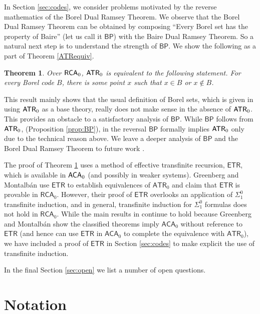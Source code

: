 \documentclass{amsart}
\newtheorem{thm}{Theorem}[section]
\theoremstyle{definition}
\theoremstyle{remark}
\newcommand{\system}[1]{\mbox{\fontfamily{cmss}\fontshape{n}\fontseries{m}%
    \selectfont#1}}
\newcommand{\RCA}{\system{RCA}\ensuremath{_0}}
\newcommand{\ACA}{\system{ACA}\ensuremath{_0}}
\newcommand{\ATR}{\system{ATR}\ensuremath{_0}}
\begin{document}
In Section \ref{sec:codes}, we consider problems motivated by
the reverse mathematics 
of the Borel Dual Ramsey Theorem.  We observe that 
the Borel Dual Ramsey Theorem can be obtained by composing 
``Every Borel set has the property of Baire'' (let us call it $\mathsf{BP}$)
with the Baire Dual Ramsey Theorem.  So a natural next step is to 
understand the strength of $\mathsf{BP}$.  We show the following
as a part of Theorem \ref{ATRequiv}.
\begin{thm}\label{thm:sillyATR}
Over $\RCA$, $\ATR$ is equivalent to the following statement.
For every Borel code $B$, there is some point $x$ 
such that $x \in B$ or $x \not \in B$. 
\end{thm}
This result mainly shows that the usual definition of Borel sets,
which is given in \cite{sosa} using $\ATR$ as a base theory,
really does not make sense in the absence of $\ATR$.  This 
provides an obstacle to a satisfactory analysis of $\mathsf{BP}$.
While $\mathsf{BP}$ follows from $\ATR$, (Proposition \ref{prop:BP}), 
in the reversal $\mathsf{BP}$ formally implies $\ATR$ only due to the 
technical reason above.  We leave a deeper analysis 
of $\mathsf{BP}$
and the Borel Dual Ramsey Theorem to future work \cite{ADMSW}.

The proof of Theorem \ref{thm:sillyATR} 
uses a method of effective transfinite recursion, $\mathsf{ETR}$, which is available in $\ACA$ (and possibly in weaker 
systems). Greenberg and Montalb\'{a}n \cite{GM} use 
$\mathsf{ETR}$ to establish equivalences of $\mathsf{ATR}_0$ and claim that $\mathsf{ETR}$ is provable in $\mathsf{RCA}_0$. However, their proof of $\mathsf{ETR}$ 
overlooks an application of $\Sigma^0_1$ transfinite induction, and in general, transfinite induction for $\Sigma^0_1$ formulas does not hold in $\mathsf{RCA}_0$. 
While the main results in \cite{GM} continue to hold because Greenberg and Montalb\'{a}n show the classified theorems imply $\mathsf{ACA}_0$ without reference to 
$\mathsf{ETR}$ (and hence can use $\mathsf{ETR}$ in $\mathsf{ACA}_0$ to complete the equivalence with $\mathsf{ATR}_0$), we have included a proof of 
$\mathsf{ETR}$ in Section \ref{sec:codes} 
to make explicit the use of transfinite induction. 


In the final Section \ref{sec:open} we list a number of open questions.



\section{Notation}
\label{sec:notation}
\end{document}

